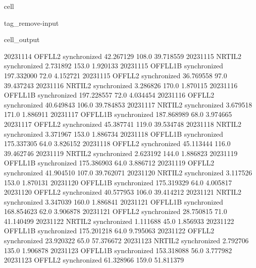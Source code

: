 \documentclass[letterpaper,10pt,english]{jupyterBook}
\begin{document}
\begin{sphinxuseclass}{cell}
\begin{sphinxuseclass}{tag_remove-input}
\begin{sphinxVerbatimOutput}
\begin{sphinxuseclass}{cell_output}
\begin{sphinxVerbatim}[commandchars=\\\{\}]
2023\PYGZhy{}11\PYGZhy{}14      OFFL\PYGZus{}L2  synchronized   42.267129   108.0   39.718559
2023\PYGZhy{}11\PYGZhy{}15      NRTI\PYGZus{}L2  synchronized    2.731892   153.0    1.920133
2023\PYGZhy{}11\PYGZhy{}15     OFFL\PYGZus{}L1B  synchronized  197.332000    72.0    4.152721
2023\PYGZhy{}11\PYGZhy{}15      OFFL\PYGZus{}L2  synchronized   36.769558    97.0   39.437243
2023\PYGZhy{}11\PYGZhy{}16      NRTI\PYGZus{}L2  synchronized    3.286826   170.0    1.870115
2023\PYGZhy{}11\PYGZhy{}16     OFFL\PYGZus{}L1B  synchronized  197.228557    72.0    4.034454
2023\PYGZhy{}11\PYGZhy{}16      OFFL\PYGZus{}L2  synchronized   40.649843   106.0   39.784853
2023\PYGZhy{}11\PYGZhy{}17      NRTI\PYGZus{}L2  synchronized    3.679518   171.0    1.886911
2023\PYGZhy{}11\PYGZhy{}17     OFFL\PYGZus{}L1B  synchronized  187.868989    68.0    3.974665
2023\PYGZhy{}11\PYGZhy{}17      OFFL\PYGZus{}L2  synchronized   45.387741   119.0   39.534748
2023\PYGZhy{}11\PYGZhy{}18      NRTI\PYGZus{}L2  synchronized    3.371967   153.0    1.886734
2023\PYGZhy{}11\PYGZhy{}18     OFFL\PYGZus{}L1B  synchronized  175.337305    64.0    3.826152
2023\PYGZhy{}11\PYGZhy{}18      OFFL\PYGZus{}L2  synchronized   45.113444   116.0   39.462746
2023\PYGZhy{}11\PYGZhy{}19      NRTI\PYGZus{}L2  synchronized    2.623192   144.0    1.886823
2023\PYGZhy{}11\PYGZhy{}19     OFFL\PYGZus{}L1B  synchronized  175.386903    64.0    3.886712
2023\PYGZhy{}11\PYGZhy{}19      OFFL\PYGZus{}L2  synchronized   41.904510   107.0   39.762071
2023\PYGZhy{}11\PYGZhy{}20      NRTI\PYGZus{}L2  synchronized    3.117526   153.0    1.870131
2023\PYGZhy{}11\PYGZhy{}20     OFFL\PYGZus{}L1B  synchronized  175.319329    64.0    4.005817
2023\PYGZhy{}11\PYGZhy{}20      OFFL\PYGZus{}L2  synchronized   40.577953   106.0   39.414212
2023\PYGZhy{}11\PYGZhy{}21      NRTI\PYGZus{}L2  synchronized    3.347039   160.0    1.886841
2023\PYGZhy{}11\PYGZhy{}21     OFFL\PYGZus{}L1B  synchronized  168.854623    62.0    3.906878
2023\PYGZhy{}11\PYGZhy{}21      OFFL\PYGZus{}L2  synchronized   28.750815    71.0   41.140499
2023\PYGZhy{}11\PYGZhy{}22      NRTI\PYGZus{}L2  synchronized    1.111688    45.0    1.856933
2023\PYGZhy{}11\PYGZhy{}22     OFFL\PYGZus{}L1B  synchronized  175.201218    64.0    9.795063
2023\PYGZhy{}11\PYGZhy{}22      OFFL\PYGZus{}L2  synchronized   23.920322    65.0   57.376672
2023\PYGZhy{}11\PYGZhy{}23      NRTI\PYGZus{}L2  synchronized    2.792706   135.0    1.906878
2023\PYGZhy{}11\PYGZhy{}23     OFFL\PYGZus{}L1B  synchronized  153.318088    56.0    3.777982
2023\PYGZhy{}11\PYGZhy{}23      OFFL\PYGZus{}L2  synchronized   61.328966   159.0   51.811379

\end{sphinxVerbatim}
\end{sphinxuseclass}
\end{sphinxVerbatimOutput}
\end{sphinxuseclass}
\end{sphinxuseclass}
\end{document}
